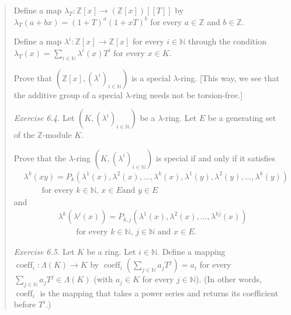 \documentclass[numbers=enddot,12pt,final,onecolumn,notitlepage]{scrartcl}%
\begin{document}
\begin{quotation}
Define a map $\lambda_{T}:\mathbb{Z}\left[  x\right]  \rightarrow\left(
\mathbb{Z}\left[  x\right]  \right)  \left[  \left[  T\right]  \right]  $ by
$\lambda_{T}\left(  a+bx\right)  =\left(  1+T\right)  ^{a}\left(  1+xT\right)
^{b}$ for every $a\in\mathbb{Z}$ and $b\in\mathbb{Z}$.

Define a map $\lambda^{i}:\mathbb{Z}\left[  x\right]  \rightarrow
\mathbb{Z}\left[  x\right]  $ for every $i\in\mathbb{N}$ through the condition
$\lambda_{T}\left(  x\right)  =\sum\limits_{i\in\mathbb{N}}\lambda^{i}\left(
x\right)  T^{i}$ for every $x\in K$.

Prove that $\left(  \mathbb{Z}\left[  x\right]  ,\left(  \lambda^{i}\right)
_{i\in\mathbb{N}}\right)  $ is a special $\lambda$-ring. [This way, we see
that the additive group of a special $\lambda$-ring needs not be torsion-free.]

\textit{Exercise 6.4.} Let $\left(  K,\left(  \lambda^{i}\right)
_{i\in\mathbb{N}}\right)  $ be a $\lambda$-ring. Let $E$ be a generating set
of the $\mathbb{Z}$-module $K$.

Prove that the $\lambda$-ring $\left(  K,\left(  \lambda^{i}\right)
_{i\in\mathbb{N}}\right)  $ is special if and only if it satisfies%
\begin{align}
&  \lambda^{k}\left(  xy\right)  =P_{k}\left(  \lambda^{1}\left(  x\right)
,\lambda^{2}\left(  x\right)  ,...,\lambda^{k}\left(  x\right)  ,\lambda
^{1}\left(  y\right)  ,\lambda^{2}\left(  y\right)  ,...,\lambda^{k}\left(
y\right)  \right) \nonumber\\
&  \ \ \ \ \ \ \ \ \ \ \text{for every }k\in\mathbb{N}\text{, }x\in E\text{
and }y\in E \label{LkxyE}%
\end{align}
and%
\begin{align}
&  \lambda^{k}\left(  \lambda^{j}\left(  x\right)  \right)  =P_{k,j}\left(
\lambda^{1}\left(  x\right)  ,\lambda^{2}\left(  x\right)  ,...,\lambda
^{kj}\left(  x\right)  \right) \nonumber\\
&  \ \ \ \ \ \ \ \ \ \ \text{for every }k\in\mathbb{N}\text{, }j\in
\mathbb{N}\text{ and }x\in E. \label{LkLjxE}%
\end{align}


\textit{Exercise 6.5.} Let $K$ be a ring. Let $i\in\mathbb{N}$. Define a
mapping $\operatorname*{coeff}\nolimits_{i}:\Lambda\left(  K\right)
\rightarrow K$ by $\operatorname*{coeff}\nolimits_{i}\left(  \sum
\limits_{j\in\mathbb{N}}a_{j}T^{j}\right)  =a_{i}$ for every $\sum
\limits_{j\in\mathbb{N}}a_{j}T^{j}\in\Lambda\left(  K\right)  $ (with
$a_{j}\in K$ for every $j\in\mathbb{N}$). (In other words,
$\operatorname*{coeff}\nolimits_{i}$ is the mapping that takes a power series
and returns its coefficient before $T^{i}.$)


\end{quotation}
\end{document}
